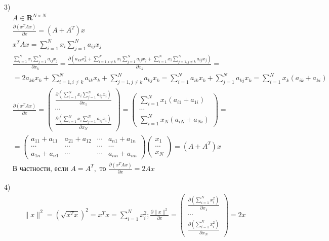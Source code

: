 \documentclass{report}
\begin{document}
\par 3)
\begin{align*}
& A \in \mathbf{R}^{N \times N} \\
& \frac{\partial ( x^T Ax )}{\partial x} = (A + A^T) x \\
& x^T Ax = \sum_{i=1}^{N} x_i \sum_{j=1}^{N} a_{i j} x_j \\
& \frac{\sum_{i=1}^{N} x_i \sum_{j=1}^{N} a_{i j} x_j}{\partial x_k} =
\frac{\partial \left(
    a_{k k} x_k^2 +
    \sum_{i=1, i \neq k}^{N} x_i \sum_{j=1}^{N} a_{i j} x_j +
    \sum_{i=1}^{N} x_i \sum_{j=1, j \neq k}^{N} a_{i j} x_j   
\right)}{\partial x_k} = \\
& = 2 a_{k k} x_k + \sum_{i=1, i \neq k}^{N} a_{i k} x_k + \sum_{j = 1, j \neq k}^{N} a_{k j} x_k
= \sum_{i=1}^{N} a_{i k} x_k + \sum_{j=1}^{N} a_{k j} x_k = \sum_{i = 1}^{N} x_k (a_{i k} + a_{k i} ) \\
& \frac{\partial ( x^T Ax )}{\partial x} = \begin{pmatrix}
    \frac{\partial \left( \sum_{i=1}^{N} x_i \sum_{j=1}^{N} a_{i j} x_i \right)}{\partial x_1} \\
    \cdots \\
    \frac{\partial \left( \sum_{i=1}^{N} x_i \sum_{j=1}^{N} a_{i j} x_i \right)}{\partial x_N}
\end{pmatrix} = \begin{pmatrix}
    \sum_{i=1}^{N} x_1 (a_{i1} + a_{1i}) \\
    \cdots \\
    \sum_{i=1}^{N} x_N (a_{i N} + a_{N i})
\end{pmatrix} = \\
& = \begin{pmatrix}
    a_{11}+a_{11} & a_{21}+a_{12} & \cdots & a_{n1}+a_{1n} \\
    \cdots & \cdots & \cdots & \cdots \\
    a_{1n}+a_{n1} & \cdots & \cdots & a_{n n}+a_{n n}
\end{pmatrix} \begin{pmatrix} x_1 \\ \cdots \\ x_N \end{pmatrix} = (A + A^T) x \\
& \text{В частности, если } A = A^T, \text{ то } \frac{\partial ( x^T Ax )}{\partial x} = 2Ax
\end{align*}

\par 4)
\begin{align*}
& \|x\|^2 = ( \sqrt{x^T x} )^2 = x^T x = \sum_{i=1}^{N} x_i^2;
\frac{\partial \|x\|^2}{\partial x} = \begin{pmatrix}
    \frac{\partial \left( \sum_{i=1}^{N} x_i^2 \right)}{\partial x_1} \\
    \cdots \\
    \frac{\partial \left( \sum_{i=1}^{N} x_i^2 \right)}{\partial x_N}
\end{pmatrix} = 2x
\end{align*}
\end{document}
